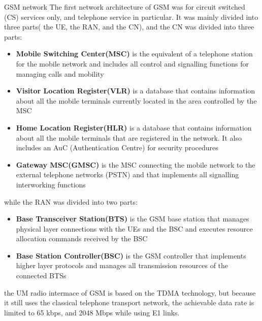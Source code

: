 \begin{section}{GSM network}
  The first network architecture of GSM was for circuit switched (CS) services only, and telephone
  service in particular. It was mainly divided into three parts( the UE, the RAN, and the CN), and 
  the CN was divided into three parts: 
  \begin{itemize}
    \item \textbf{Mobile Switching Center(MSC)} is the equivalent of a telephone station for the
      mobile network and includes all control and signalling functions for managing calls and
      mobility
    \item \textbf{Visitor Location Register(VLR)} is a database that contains information about all
      the mobile terminals currently located in the area controlled by the MSC
    \item \textbf{Home Location Register(HLR)} is a database that contains information about all the
      mobile terminals that are registered in the network. It also includes an AuC (Authentication
      Centre) for security procedures
    \item \textbf{Gateway MSC(GMSC)} is the MSC connecting the mobile network to the external
      telephone networks (PSTN) and that implements all signalling interworking functions
  \end{itemize}
  while the RAN was divided into two parts:
  \begin{itemize}
    \item \textbf{Base Transceiver Station(BTS)} is the GSM base station that manages physical layer
      connections with the UEs and the BSC and executes resource allocation commands received by the
      BSC
    \item \textbf{Base Station Controller(BSC)} is the GSM controller that implements higher layer
      protocols and manages all transmission resources of the connected BTSs
  \end{itemize}
  the UM radio intermace of GSM is based on the TDMA technology, but because it still uses the
  classical telephone transport network, the achievable data rate is limited to 65 kbps, and 2048
  Mbps while using E1 links.\\


\end{section}
